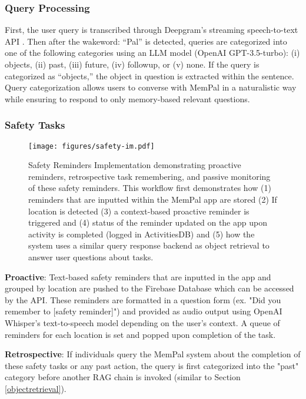 \subsubsection{Query Processing}
First, the user query is transcribed through Deepgram’s streaming speech-to-text API \cite{deepgramspeech}. Then after the wakeword: “Pal” is detected, queries are categorized into one of the following categories using an LLM model (OpenAI GPT-3.5-turbo): (i) objects, (ii) past, (iii) future, (iv) followup, or (v) none. If the query is categorized as “objects,” the object in question is extracted within the sentence. Query categorization allows users to converse with MemPal in a naturalistic way while ensuring to respond to only memory-based relevant questions.  



\subsubsection{Safety Tasks}
\begin{figure*}
    \centering
    \texttt{[image: figures/safety-im.pdf]}
    \caption{Safety Reminders Implementation demonstrating proactive reminders, retrospective task remembering, and passive monitoring of these safety reminders. This workflow first demonstrates how (1) reminders that are inputted within the MemPal app are stored (2) If location is detected (3) a context-based proactive reminder is triggered and (4) status of the reminder updated on the app upon activity is completed (logged in ActivitiesDB) and  (5) how the system uses a similar query response backend as object retrieval to answer user questions about tasks.}   
    \label{fig:enter-label}
\end{figure*}

\textbf{Proactive}: Text-based safety reminders that are inputted in the app and grouped by location are pushed to the Firebase Database which can be accessed by the API. These reminders are formatted in a question form (ex. "Did you remember to [safety reminder]") and provided as audio output using OpenAI Whisper’s text-to-speech model depending on the user's context. A queue of reminders for each location is set and popped upon completion of the task. 

\textbf{Retrospective}: If individuals query the MemPal system about the completion of these safety tasks or any past action, the query is first categorized into the "past" category before another RAG chain is invoked (similar to Section \ref{objectretrieval}).


